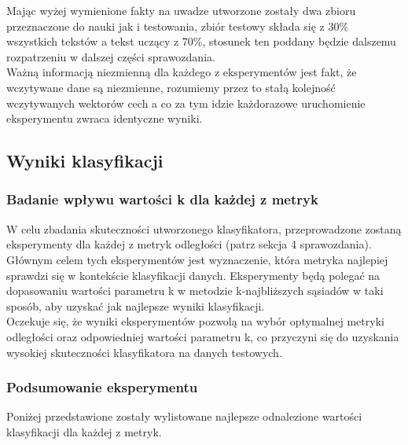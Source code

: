 \documentclass{article}
\begin{document}
\noindent Mając wyżej wymienione fakty na uwadze utworzone zostały dwa zbioru przeznaczone do nauki jak i testowania, zbiór testowy składa się z 30\% wszystkich tekstów a tekst uczący z 70\%, stosunek ten poddany będzie dalszemu rozpatrzeniu w dalszej części sprawozdania. \\

\noindent Ważną informacją niezmienną dla każdego z eksperymentów jest fakt, że wczytywane dane są niezmienne, rozumiemy przez to stałą kolejność wczytywanych wektorów cech a co za tym idzie każdorazowe uruchomienie eksperymentu zwraca identyczne wyniki.

\subsection*{Wyniki klasyfikacji}

\subsubsection*{Badanie wpływu wartości k dla każdej z metryk}

W celu zbadania skuteczności utworzonego klasyfikatora, przeprowadzone zostaną eksperymenty dla każdej z metryk odległości (patrz sekcja 4 sprawozdania). Głównym celem tych eksperymentów jest wyznaczenie, która metryka najlepiej sprawdzi się w kontekście klasyfikacji danych. Eksperymenty będą polegać na dopasowaniu wartości parametru k w metodzie k-najbliższych sąsiadów w taki sposób, aby uzyskać jak najlepsze wyniki klasyfikacji. \\

\noindent Oczekuje się, że wyniki eksperymentów pozwolą na wybór optymalnej metryki odległości oraz odpowiedniej wartości parametru k, co przyczyni się do uzyskania wysokiej skuteczności klasyfikatora na danych testowych.





\newpage

\subsubsection*{Podsumowanie eksperymentu}

\noindent Poniżej przedstawione zostały wylistowane najlepsze odnalezione wartości klasyfikacji dla każdej z metryk. \\


\end{document}
